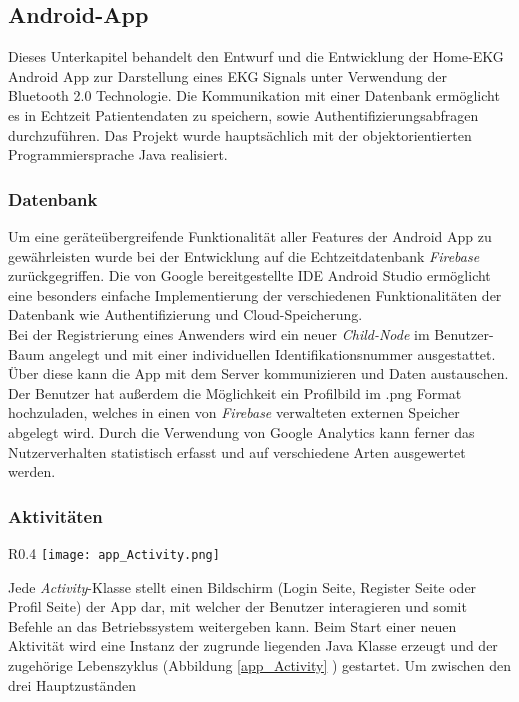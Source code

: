 \subsection{Android-App}
Dieses Unterkapitel behandelt den Entwurf und die Entwicklung der Home-EKG Android App zur Darstellung eines EKG Signals unter Verwendung der Bluetooth 2.0 Technologie. Die Kommunikation mit einer Datenbank ermöglicht es in Echtzeit Patientendaten zu speichern, sowie Authentifizierungsabfragen durchzuführen. Das Projekt wurde hauptsächlich mit der objektorientierten Programmiersprache Java realisiert. 

\subsubsection{Datenbank}
Um eine geräteübergreifende Funktionalität aller Features der Android App zu gewährleisten wurde bei der Entwicklung auf die Echtzeitdatenbank \textit{Firebase} \cite{Firebase}  zurückgegriffen. Die von Google bereitgestellte IDE Android Studio \cite{Android_Studio} ermöglicht eine besonders einfache Implementierung der verschiedenen Funktionalitäten der Datenbank wie Authentifizierung und Cloud-Speicherung. \\
Bei der Registrierung eines Anwenders wird ein neuer \textit{Child-Node} im Benutzer-Baum angelegt und mit einer individuellen Identifikationsnummer ausgestattet. Über diese kann die App mit dem Server kommunizieren und Daten austauschen. \\
Der Benutzer hat außerdem die Möglichkeit ein Profilbild im .png Format hochzuladen, welches in einen von \textit{Firebase} verwalteten externen Speicher abgelegt wird. Durch die Verwendung von Google Analytics \cite{Google_Analytics} kann ferner das Nutzerverhalten statistisch erfasst und auf verschiedene Arten ausgewertet werden. 

\subsubsection{Aktivitäten}

\begin{wrapfigure}[12]{R}{0.4\textwidth}
\vspace{-25pt}
\texttt{[image: app\_Activity.png]}
\caption{Lebenszyklus}
\label{app_Activity}
\end{wrapfigure}

Jede \textit{Activity}-Klasse \cite{Activity_Overview} stellt einen Bildschirm (Login Seite, Register Seite oder Profil Seite) der App dar, mit welcher der Benutzer interagieren und somit Befehle an das Betriebssystem weitergeben kann. Beim Start einer neuen Aktivität wird eine Instanz der zugrunde liegenden Java Klasse erzeugt und der zugehörige Lebenszyklus (Abbildung \ref{app_Activity} \cite{Activity_Lifecycle}) gestartet.
Um zwischen den drei Hauptzuständen

